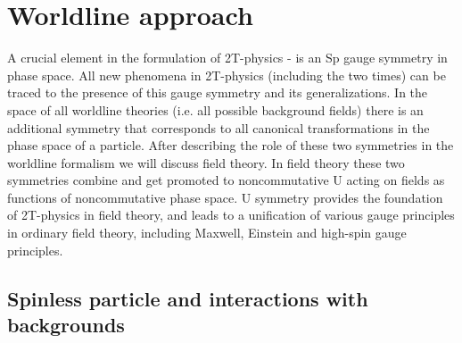 \documentclass[a4paper,12pt]{article}
\begin{document}
\newpage





















\section{Worldline approach}

A crucial element in the formulation of 2T-physics \cite{survey2T}-\cite
{NCu11} is an Sp\coordHE{} gauge symmetry in phase space. All new
phenomena in 2T-physics (including the two times) can be traced to the
presence of this gauge symmetry and its generalizations. In the space of all
worldline theories (i.e. all possible background fields) there is an
additional symmetry that corresponds to all canonical transformations in the
phase space of a particle. After describing the role of these two symmetries
in the worldline formalism we will discuss field theory. In field theory
these two symmetries combine and get promoted to noncommutative U\coordHE{} acting on fields as functions of noncommutative phase
space. U\coordHE{} symmetry provides the foundation of
2T-physics in field theory, and leads to a unification of various gauge
principles in ordinary field theory, including Maxwell, Einstein and
high-spin gauge principles.

\subsection{Spinless particle and interactions with backgrounds}
\end{document}
